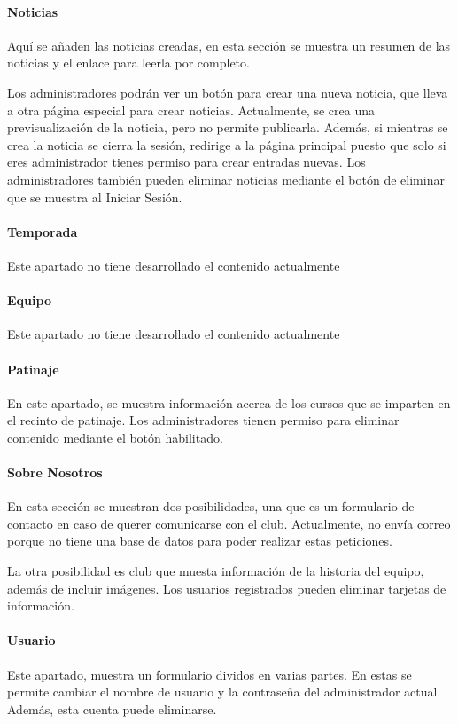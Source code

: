 \documentclass[10pt, spanish, pdftex]{template/UC3M_document}
\begin{document}
\paragraph{Noticias}
Aquí se añaden las noticias creadas, en esta sección se muestra un resumen de las noticias y el enlace para leerla por completo.

Los administradores podrán ver un botón para crear una nueva noticia, que lleva a otra página especial para crear noticias. Actualmente, se crea una previsualización de la noticia, pero no permite publicarla. Además, si mientras se crea la noticia se cierra la sesión, redirige a la página principal puesto que solo si eres administrador tienes permiso para crear entradas nuevas.
Los administradores también pueden eliminar noticias mediante el botón de eliminar que se muestra al Iniciar Sesión.
\paragraph{Temporada}
Este apartado no tiene desarrollado el contenido actualmente

\paragraph{Equipo}
Este apartado no tiene desarrollado el contenido actualmente

\paragraph{Patinaje}
En este apartado, se muestra información acerca de los cursos que se imparten en el recinto de patinaje. Los administradores tienen permiso para eliminar contenido mediante el botón habilitado.

\paragraph{Sobre Nosotros}
En esta sección se muestran dos posibilidades, una que es un formulario de contacto en caso de querer comunicarse con el club. Actualmente, no envía correo porque no tiene una base de datos para poder realizar estas peticiones.

La otra posibilidad es club que muesta información de la historia del equipo, además de incluir imágenes.
Los usuarios registrados pueden eliminar tarjetas de información.

\paragraph{Usuario}
Este apartado, muestra un formulario dividos en varias partes. En estas se permite cambiar el nombre de usuario y la contraseña del administrador actual. Además, esta cuenta puede eliminarse.
\end{document}
